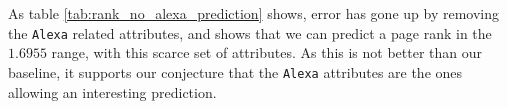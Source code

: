 As table \ref{tab:rank_no_alexa_prediction} shows, error has gone up by removing the \texttt{Alexa} related attributes, and shows that we can predict a page rank in the \(1.6955\) range, with this scarce set of attributes. As this is not better than our baseline, it supports our conjecture that the \texttt{Alexa} attributes are the ones allowing an interesting prediction.